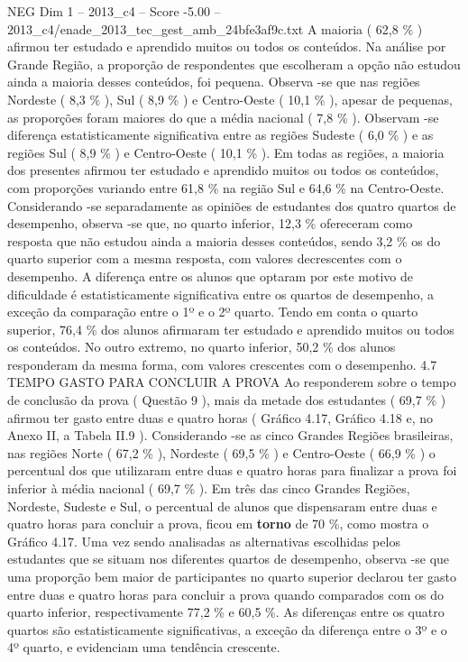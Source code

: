 \begin{textsample}{NEG Dim 1 – 2013\_c4 – Score -5.00 – 2013\_c4/enade\_2013\_tec\_gest\_amb\_24bfe3af9c.txt}
A maioria ( 62,8 \% ) afirmou ter estudado e aprendido muitos ou todos os conteúdos.
Na análise por Grande Região, a proporção de respondentes que escolheram a opção não estudou ainda a maioria desses conteúdos, foi pequena.
Observa -se que nas regiões Nordeste ( 8,3 \% ), Sul ( 8,9 \% ) e Centro-Oeste ( 10,1 \% ), apesar de pequenas, as proporções foram maiores do que a média nacional ( 7,8 \% ).
Observam -se diferença estatisticamente significativa entre as regiões Sudeste ( 6,0 \% ) e as regiões Sul ( 8,9 \% ) e Centro-Oeste ( 10,1 \% ).
Em todas as regiões, a maioria dos presentes afirmou ter estudado e aprendido muitos ou todos os conteúdos, com proporções variando entre 61,8 \% na região Sul e 64,6 \% na Centro-Oeste.
Considerando -se separadamente as opiniões de estudantes dos quatro quartos de desempenho, observa -se que, no quarto inferior, 12,3 \% ofereceram como resposta que não estudou ainda a maioria desses conteúdos, sendo 3,2 \% os do quarto superior com a mesma resposta, com valores decrescentes com o desempenho.
A diferença entre os alunos que optaram por este motivo de dificuldade é estatisticamente significativa entre os quartos de desempenho, a exceção da comparação entre o 1º e o 2º quarto.
Tendo em conta o quarto superior, 76,4 \% dos alunos afirmaram ter estudado e aprendido muitos ou todos os conteúdos.
No outro extremo, no quarto inferior, 50,2 \% dos alunos responderam da mesma forma, com valores crescentes com o desempenho. 4.7 TEMPO GASTO PARA CONCLUIR A PROVA Ao responderem sobre o tempo de conclusão da prova ( Questão 9 ), mais da metade dos estudantes ( 69,7 \% ) afirmou ter gasto entre duas e quatro horas ( Gráfico 4.17, Gráfico 4.18 e, no Anexo II, a Tabela II.9 ).
Considerando -se as cinco Grandes Regiões brasileiras, nas regiões Norte ( 67,2 \% ), Nordeste ( 69,5 \% ) e Centro-Oeste ( 66,9 \% ) o percentual dos que utilizaram entre duas e quatro horas para finalizar a prova foi inferior à média nacional ( 69,7 \% ).
Em três das cinco Grandes Regiões, Nordeste, Sudeste e Sul, o percentual de alunos que dispensaram entre duas e quatro horas para concluir a prova, ficou em \textbf{torno} de 70 \%, como mostra o Gráfico 4.17.
Uma vez sendo analisadas as alternativas escolhidas pelos estudantes que se situam nos diferentes quartos de desempenho, observa -se que uma proporção bem maior de participantes no quarto superior declarou ter gasto entre duas e quatro horas para concluir a prova quando comparados com os do quarto inferior, respectivamente 77,2 \% e 60,5 \%.
As diferenças entre os quatro quartos são estatisticamente significativas, a exceção da diferença entre o 3º e o 4º quarto, e evidenciam uma tendência crescente.

\end{textsample}
